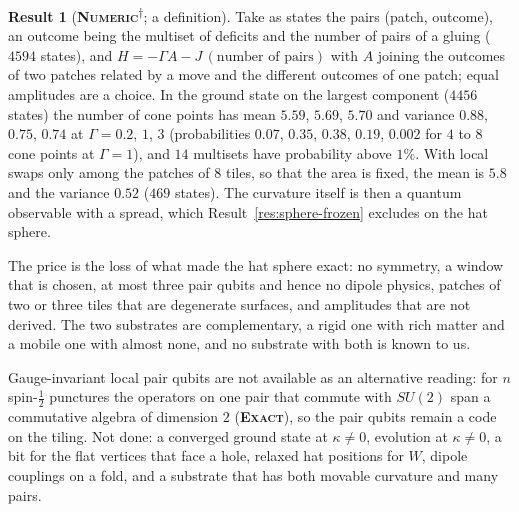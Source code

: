 \documentclass[11pt]{article}
\newcommand{\exact}{\textbf{\textsc{Exact}}}
\newcommand{\numeric}{\textbf{\textsc{Numeric}}}
\newcommand{\snap}{\textsuperscript{$\dagger$}}      %
\theoremstyle{definition}
\newtheorem{result}{Result}
\begin{document}
\begin{result}[\numeric\snap; a definition]\label{res:folds-model}
Take as states the pairs (patch, outcome), an outcome being the multiset of deficits and the number of pairs of a gluing ($4594$ states), and $H=-\Gamma A-J\,(\text{number of pairs})$ with $A$ joining the outcomes of two patches related by a move and the different outcomes of one patch; equal amplitudes are a choice. In the ground state on the largest component ($4456$ states) the number of cone points has mean $5.59$, $5.69$, $5.70$ and variance $0.88$, $0.75$, $0.74$ at $\Gamma=0.2$, $1$, $3$ (probabilities $0.07$, $0.35$, $0.38$, $0.19$, $0.002$ for $4$ to $8$ cone points at $\Gamma=1$), and $14$ multisets have probability above $1\%$. With local swaps only among the patches of $8$ tiles, so that the area is fixed, the mean is $5.8$ and the variance $0.52$ ($469$ states). The curvature itself is then a quantum observable with a spread, which Result~\ref{res:sphere-frozen} excludes on the hat sphere.
\end{result}
The price is the loss of what made the hat sphere exact: no symmetry, a window that is chosen, at most three pair qubits and hence no dipole physics, patches of two or three tiles that are degenerate surfaces, and amplitudes that are not derived. The two substrates are complementary, a rigid one with rich matter and a mobile one with almost none, and no substrate with both is known to us.

Gauge-invariant local pair qubits are not available as an alternative reading: for $n$ spin-$\frac12$ punctures the operators on one pair that commute with $SU(2)$ span a commutative algebra of dimension $2$ (\exact), so the pair qubits remain a code on the tiling. Not done: a converged ground state at $\kappa\neq0$, evolution at $\kappa\neq0$, a bit for the flat vertices that face a hole, relaxed hat positions for $W$, dipole couplings on a fold, and a substrate that has both movable curvature and many pairs.

\end{document}

